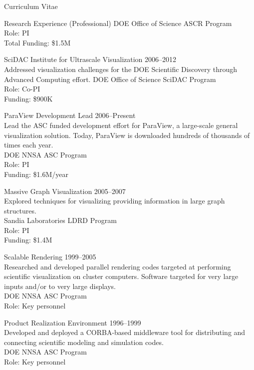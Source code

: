 \documentclass{article}
\begin{document}
\begin{cv}{Curriculum Vitae}
\begin{cvlist}{Research Experience (Professional)}
      DOE Office of Science ASCR Program\\
      Role: PI\\
      Total Funding: \$1.5M
    \item[SciDAC Institute for Ultrascale Visualization]\hfill 2006--2012\\
      Addressed visualization challenges for the DOE Scientific Discovery through Advanced Computing effort.
      DOE Office of Science SciDAC Program\\
      Role: Co-PI\\
      Funding: \$900K
    \item[ParaView Development Lead]\hfill 2006--Present\\
      Lead the ASC funded development effort for ParaView, a large-scale
      general visualization solution. Today, ParaView is downloaded hundreds of thousands of times each year.\\
      DOE NNSA ASC Program\\
      Role: PI\\
      Funding: \$1.6M/year %
    \item[Massive Graph Visualization]\hfill 2005--2007 \\
      Explored techniques for visualizing providing information in large
      graph structures.\\
      Sandia Laboratories LDRD Program\\
      Role: PI\\
      Funding: \$1.4M
    \item[Scalable Rendering]\hfill 1999--2005 \\
      Researched and developed parallel rendering codes targeted at performing scientific visualization on cluster computers.  Software targeted for very large inputs and/or to very large displays.\\
      DOE NNSA ASC Program\\
      Role: Key personnel
    \item[Product Realization Environment]\hfill 1996--1999 \\
      Developed and deployed a CORBA-based middleware tool for distributing
      and connecting scientific modeling and simulation codes.\\
      DOE NNSA ASC Program\\
      Role: Key personnel
    \end{cvlist}


\end{cv}
\end{document}
